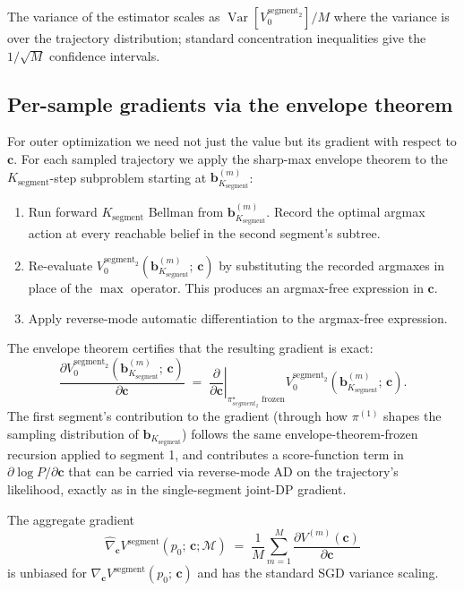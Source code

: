 \documentclass[11pt,a4paper]{article}
\newcommand{\bc}{\bm{c}}
\newcommand{\bb}{\bm{b}}
\newcommand{\Var}{\operatorname{Var}}
\begin{document}
The variance of the estimator scales as $\Var[V_0^{\mathrm{segment}_2}] / M$ where the
variance is over the trajectory distribution; standard concentration inequalities give
the $1/\sqrt{M}$ confidence intervals.

\subsection{Per-sample gradients via the envelope theorem}

For outer optimization we need not just the value but its gradient with respect to $\bc$.
For each sampled trajectory we apply the sharp-max envelope theorem to the
$K_\mathrm{segment}$-step subproblem starting at $\bb_{K_\mathrm{segment}}^{(m)}$:
\begin{enumerate}[nosep, leftmargin=2em]
\item Run forward $K_\mathrm{segment}$ Bellman from $\bb_{K_\mathrm{segment}}^{(m)}$.  Record
      the optimal argmax action at every reachable belief in the second segment's subtree.
\item Re-evaluate $V_0^{\mathrm{segment}_2}(\bb_{K_\mathrm{segment}}^{(m)};\, \bc)$ by
      substituting the recorded argmaxes in place of the $\max$ operator.  This produces
      an argmax-free expression in $\bc$.
\item Apply reverse-mode automatic differentiation to the argmax-free expression.
\end{enumerate}

The envelope theorem certifies that the resulting gradient is exact:
\begin{equation}
\frac{\partial V_0^{\mathrm{segment}_2}(\bb_{K_\mathrm{segment}}^{(m)};\, \bc)}{\partial \bc}
\;=\;
\left.\frac{\partial}{\partial \bc}\right|_{\pi^\star_{segment_2} \text{ frozen}}
V_0^{\mathrm{segment}_2}(\bb_{K_\mathrm{segment}}^{(m)};\, \bc).
\label{eq:envelope}
\end{equation}
The first segment's contribution to the gradient (through how $\pi^{(1)}$ shapes the sampling
distribution of $\bb_{K_\mathrm{segment}}$) follows the same envelope-theorem-frozen recursion
applied to segment 1, and contributes a score-function term in $\partial \log P / \partial \bc$
that can be carried via reverse-mode AD on the trajectory's likelihood, exactly as in the
single-segment joint-DP gradient.

The aggregate gradient
\begin{equation}
\widehat{\nabla}_{\bc} V^\mathrm{segment}(p_0;\, \bc; \mathcal{M})
\;=\;
\frac{1}{M} \sum_{m=1}^{M}
\frac{\partial V^{(m)}(\bc)}{\partial \bc}
\label{eq:agg_grad}
\end{equation}
is unbiased for $\nabla_{\bc} V^\mathrm{segment}(p_0;\, \bc)$ and has the standard SGD
variance scaling.
\end{document}
